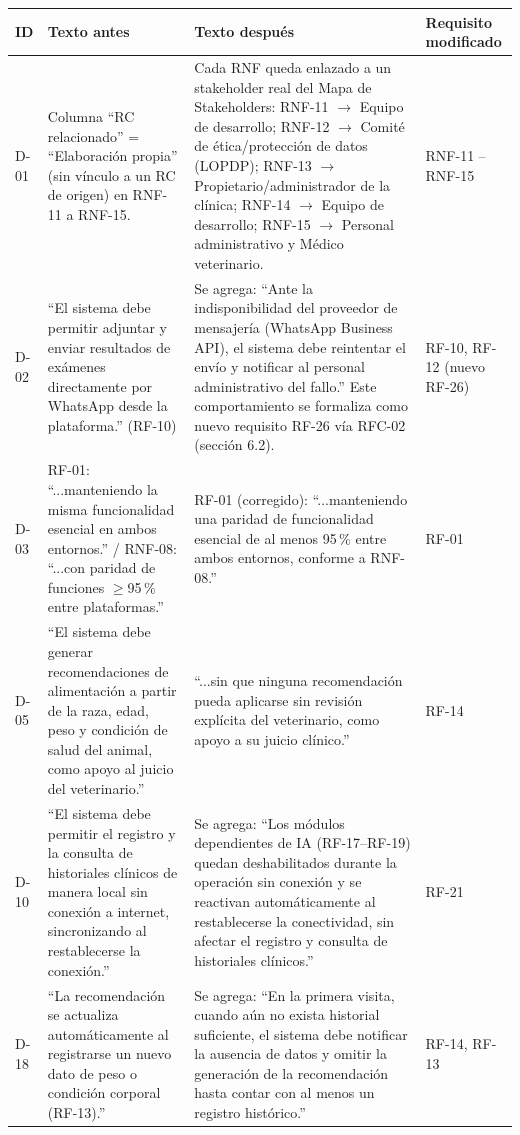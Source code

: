 \documentclass[11pt,a4paper]{article}
\begin{document}
\begin{longtable}{p{0.9cm}p{4.3cm}p{4.6cm}p{2.1cm}}
\toprule
\textbf{ID} & \textbf{Texto antes} & \textbf{Texto después} & \textbf{Requisito modificado} \\
\midrule
\endhead
D-01 &
Columna ``RC relacionado'' = ``Elaboración propia'' (sin vínculo a un RC de origen) en RNF-11 a RNF-15. &
Cada RNF queda enlazado a un stakeholder real del Mapa de Stakeholders: RNF-11 $\to$ Equipo de desarrollo; RNF-12 $\to$ Comité de ética/protección de datos (LOPDP); RNF-13 $\to$ Propietario/administrador de la clínica; RNF-14 $\to$ Equipo de desarrollo; RNF-15 $\to$ Personal administrativo y Médico veterinario. &
RNF-11 -- RNF-15 \\
\addlinespace
D-02 &
``El sistema debe permitir adjuntar y enviar resultados de exámenes directamente por WhatsApp desde la plataforma.'' (RF-10) &
Se agrega: ``Ante la indisponibilidad del proveedor de mensajería (WhatsApp Business API), el sistema debe reintentar el envío y notificar al personal administrativo del fallo.'' Este comportamiento se formaliza como nuevo requisito RF-26 vía RFC-02 (sección 6.2). &
RF-10, RF-12 (nuevo RF-26) \\
\addlinespace
D-03 &
RF-01: ``...manteniendo la misma funcionalidad esencial en ambos entornos.'' / RNF-08: ``...con paridad de funciones $\geq$95\,\% entre plataformas.'' &
RF-01 (corregido): ``...manteniendo una paridad de funcionalidad esencial de al menos 95\,\% entre ambos entornos, conforme a RNF-08.'' &
RF-01 \\
\addlinespace
D-05 &
``El sistema debe generar recomendaciones de alimentación a partir de la raza, edad, peso y condición de salud del animal, como apoyo al juicio del veterinario.'' &
``...sin que ninguna recomendación pueda aplicarse sin revisión explícita del veterinario, como apoyo a su juicio clínico.'' &
RF-14 \\
\addlinespace
D-10 &
``El sistema debe permitir el registro y la consulta de historiales clínicos de manera local sin conexión a internet, sincronizando al restablecerse la conexión.'' &
Se agrega: ``Los módulos dependientes de IA (RF-17--RF-19) quedan deshabilitados durante la operación sin conexión y se reactivan automáticamente al restablecerse la conectividad, sin afectar el registro y consulta de historiales clínicos.'' &
RF-21 \\
\addlinespace
D-18 &
``La recomendación se actualiza automáticamente al registrarse un nuevo dato de peso o condición corporal (RF-13).'' &
Se agrega: ``En la primera visita, cuando aún no exista historial suficiente, el sistema debe notificar la ausencia de datos y omitir la generación de la recomendación hasta contar con al menos un registro histórico.'' &
RF-14, RF-13 \\
\bottomrule
\end{longtable}
\end{document}
